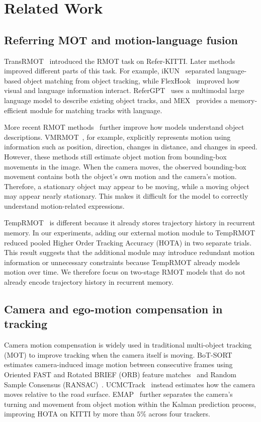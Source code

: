 \documentclass[sigconf,anonymous,nonacm]{acmart}
\begin{document}
\section{Related Work}
\label{sec:related}

\subsection{Referring MOT and motion-language fusion}
TransRMOT~\cite{transrmot} introduced the RMOT task on Refer-KITTI. Later methods improved different parts of this task. For example, iKUN~\cite{ikun} separated language-based object matching from object tracking, while FlexHook~\cite{flexhook} improved how visual and language information interact. ReferGPT~\cite{refergpt} uses a multimodal large language model to describe existing object tracks, and MEX~\cite{mex} provides a memory-efficient module for matching tracks with language.

More recent RMOT methods~\cite{mlstrack,deeprmot,cdrmot,tellmewhat} further improve how models understand object descriptions. VMRMOT~\cite{vmrmot}, for example, explicitly represents motion using information such as position, direction, changes in distance, and changes in speed. However, these methods still estimate object motion from bounding-box movements in the image. When the camera moves, the observed bounding-box movement contains both the object’s own motion and the camera’s motion. Therefore, a stationary object may appear to be moving, while a moving object may appear nearly stationary. This makes it difficult for the model to correctly understand motion-related expressions.

TempRMOT~\cite{temprmot} is different because it already stores trajectory history in recurrent memory. In our experiments, adding our external motion module to TempRMOT reduced pooled Higher Order Tracking Accuracy (HOTA) in two separate trials. This result suggests that the additional module may introduce redundant motion information or unnecessary constraints because TempRMOT already models motion over time. We therefore focus on two-stage RMOT models that do not already encode trajectory history in recurrent memory.

\subsection{Camera and ego-motion compensation in tracking}

Camera motion compensation is widely used in traditional multi-object tracking (MOT) to improve tracking when the camera itself is moving. BoT-SORT~\cite{botsort} estimates camera-induced image motion between consecutive frames using Oriented FAST and Rotated BRIEF (ORB) feature matches~\cite{orb} and Random Sample Consensus (RANSAC)~\cite{ransac}. UCMCTrack~\cite{ucmctrack} instead estimates how the camera moves relative to the road surface. EMAP~\cite{emap} further separates the camera's turning and movement from object motion within the Kalman prediction process, improving HOTA on KITTI by more than $5\%$ across four trackers.
\end{document}
